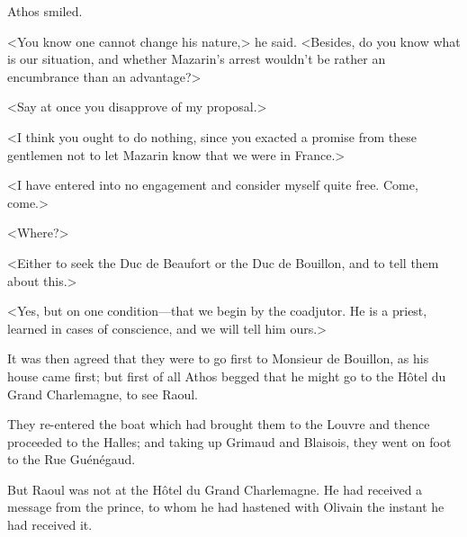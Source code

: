 Athos smiled.

<You know one cannot change his nature,> he said. <Besides, do you know what is our situation, and whether Mazarin's arrest wouldn't be rather an encumbrance than an advantage?>

<Say at once you disapprove of my proposal.>

<I think you ought to do nothing, since you exacted a promise from these gentlemen not to let Mazarin know that we were in France.>

<I have entered into no engagement and consider myself quite free. Come, come.>

<Where?>

<Either to seek the Duc de Beaufort or the Duc de Bouillon, and to tell them about this.>

<Yes, but on one condition—that we begin by the coadjutor. He is a priest, learned in cases of conscience, and we will tell him ours.>

It was then agreed that they were to go first to Monsieur de Bouillon, as his house came first; but first of all Athos begged that he might go to the Hôtel du Grand Charlemagne, to see Raoul.

They re-entered the boat which had brought them to the Louvre and thence proceeded to the Halles; and taking up Grimaud and Blaisois, they went on foot to the Rue Guénégaud.

But Raoul was not at the Hôtel du Grand Charlemagne. He had received a message from the prince, to whom he had hastened with Olivain the instant he had received it. 